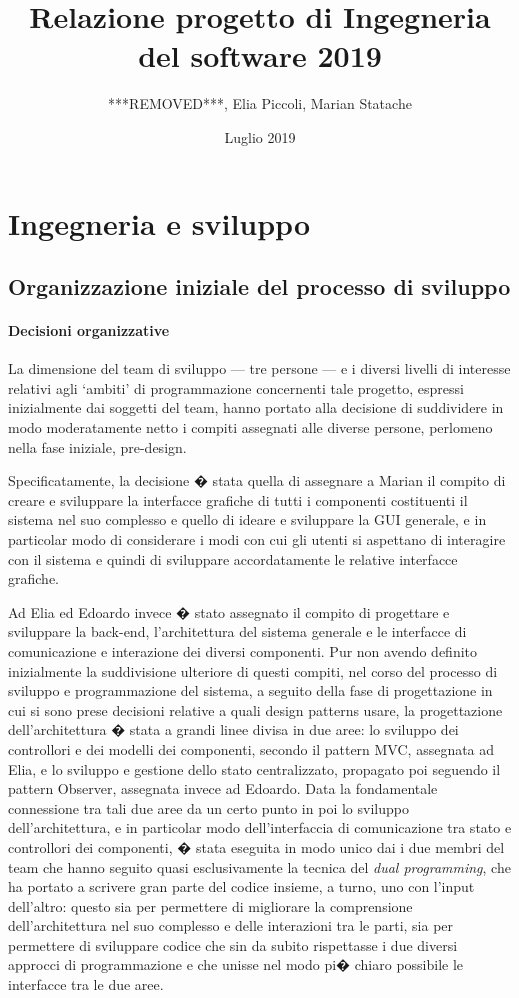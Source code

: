 \documentclass[final, smallexted]{svjour3}
\title{Relazione progetto di Ingegneria del software 2019}
\author{***REMOVED***, Elia Piccoli, Marian Statache}
\date{Luglio 2019}
\begin{document}
\maketitle

\newpage
\section{Ingegneria e sviluppo}
\subsection{Organizzazione iniziale del processo di sviluppo}

\paragraph{\textbf{Decisioni organizzative}}
La dimensione del team di sviluppo --- tre persone --- e i diversi livelli di interesse relativi agli `ambiti' di programmazione concernenti tale progetto, espressi inizialmente dai soggetti del team, hanno portato alla decisione di suddividere in modo moderatamente netto i compiti assegnati alle diverse persone, perlomeno nella fase iniziale, pre-design. 

Specificatamente, la decisione � stata quella di assegnare a Marian il compito di creare e sviluppare la interfacce grafiche di tutti i componenti costituenti il sistema nel suo complesso e quello di ideare e sviluppare la GUI generale, e in particolar modo di considerare i modi con cui gli utenti si aspettano di interagire con il sistema e quindi di sviluppare accordatamente le relative interfacce grafiche.

Ad Elia ed Edoardo invece � stato assegnato il compito di progettare e sviluppare la back-end, l'architettura del sistema generale e le interfacce di comunicazione e interazione dei diversi componenti. Pur non avendo definito inizialmente la suddivisione ulteriore di questi compiti, nel corso del processo di sviluppo e programmazione del sistema, a seguito della fase di progettazione in cui si sono prese decisioni relative a quali design patterns usare, la progettazione dell'architettura � stata a grandi linee divisa in due aree: lo sviluppo dei controllori e dei modelli dei componenti, secondo il pattern MVC, assegnata ad Elia, e lo sviluppo e gestione dello stato centralizzato, propagato poi seguendo il pattern Observer, assegnata invece ad Edoardo. Data la fondamentale connessione tra tali due aree da un certo punto in poi lo sviluppo dell'architettura, e in particolar modo dell'interfaccia di comunicazione tra stato e controllori dei componenti, � stata eseguita in modo unico dai i due membri del team che hanno seguito quasi esclusivamente la tecnica del \textit{dual programming}, che ha portato a scrivere gran parte del codice insieme, a turno, uno con l'input dell'altro: questo sia per permettere di migliorare la comprensione dell'architettura nel suo complesso e delle interazioni tra le parti, sia per permettere di sviluppare codice che sin da subito rispettasse i due diversi approcci di programmazione e che unisse nel modo pi� chiaro possibile le interfacce tra le due aree.
\end{document}
